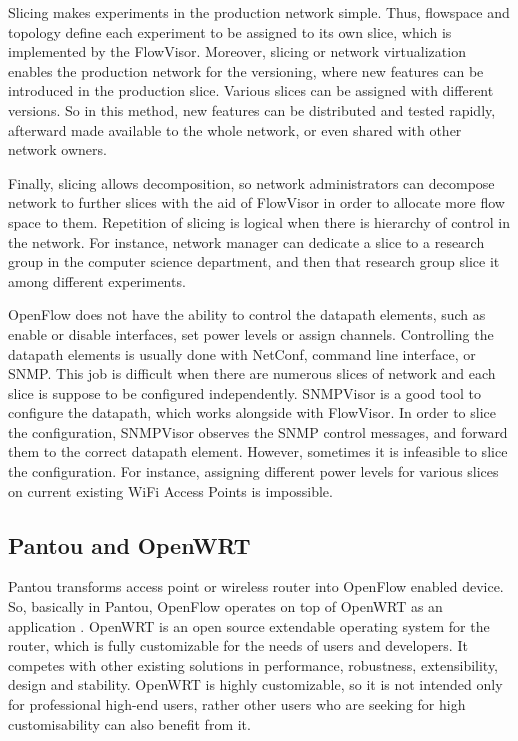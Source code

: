 \documentclass[english]{tktltiki2}
\theoremstyle{definition}
\theoremstyle{remark}
\begin{document}
{Slicing makes experiments in the production network simple. Thus, flowspace and topology define each experiment to be assigned to its own slice, which is implemented by the FlowVisor. Moreover, slicing or network virtualization enables the production network for the versioning, where new features can be introduced in the production slice. Various slices can be assigned with different versions. So in this method, new features can be distributed and tested rapidly, afterward made available to the whole network, or even shared with other network owners. \cite{Yap10a}

Finally, slicing allows decomposition, so network administrators can decompose network to further slices with the aid of FlowVisor in order to allocate more flow space to them. Repetition of slicing is logical when there is hierarchy of control in the network. For instance, network manager can dedicate a slice to a research group in the computer science department, and then that research group slice it among different experiments. \cite{Yap10a}

OpenFlow does not have the ability to control the datapath elements, such as enable or disable interfaces, set power levels or assign channels. Controlling the datapath elements is usually done with NetConf, command line interface, or SNMP. This job is difficult when there are numerous slices of network and each slice is suppose to be configured independently. SNMPVisor is a good tool to configure the datapath, which works alongside with FlowVisor. In order to slice the configuration, SNMPVisor observes the SNMP control messages, and forward them to the correct datapath element. However, sometimes it is infeasible to slice the configuration. For instance, assigning different power levels for various slices on current existing WiFi Access Points is impossible. \cite{Yap10a}

\subsection{Pantou and OpenWRT}

Pantou transforms access point or wireless router into OpenFlow enabled device. So, basically in Pantou, OpenFlow operates on top of OpenWRT as an application \cite{Yia04}. OpenWRT is an open source extendable operating system for the router, which is fully customizable for the needs of users and developers. It competes with other existing solutions in performance, robustness, extensibility, design and stability. OpenWRT is highly customizable, so it is not intended only for professional high-end users, rather other users who are seeking for high customisability can also benefit from it.  \cite{Lor14}

}
\end{document}
